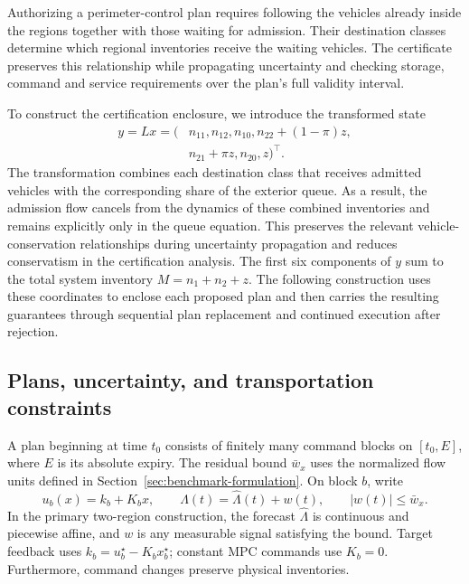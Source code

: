 \documentclass[journal,10pt]{IEEEtran}
\begin{document}
Authorizing a perimeter-control plan requires following the vehicles already
inside the regions together with those waiting for admission. Their
destination classes determine which regional inventories receive the waiting
vehicles. The certificate preserves this relationship while propagating
uncertainty and checking storage, command and service requirements over the
plan's full validity interval.

To construct the certification enclosure, we introduce the transformed state
\begin{equation}
\begin{aligned}
y=Lx=(&n_{11},n_{12},n_{10},n_{22}+(1-\pi)z,\\
      &n_{21}+\pi z,n_{20},z)^\top.
\end{aligned}
\label{eq:new-conservation-coordinates}
\end{equation}
The transformation combines each destination class that receives admitted
vehicles with the corresponding share of the exterior queue. As a result, the
admission flow cancels from the dynamics of these combined inventories and
remains explicitly only in the queue equation. This preserves the relevant
vehicle-conservation relationships during uncertainty propagation and reduces
conservatism in the certification analysis. The first six components of $y$
sum to the total system inventory $M=n_1+n_2+z$. The following construction
uses these coordinates to enclose each proposed plan and then carries the
resulting guarantees through sequential plan replacement and continued
execution after rejection.

\subsection{Plans, uncertainty, and transportation constraints}

A plan beginning at time $t_0$ consists of finitely many command blocks on
$[t_0,E]$, where $E$ is its absolute expiry. The residual bound $\bar w_x$ uses
the normalized flow units defined in Section~\ref{sec:benchmark-formulation}.
On block $b$, write
\begin{equation}
 u_b(x)=k_b+K_bx,
 \qquad \Lambda(t)=\widehat\Lambda(t)+w(t),
 \qquad |w(t)|\le\bar w_x.
 \label{eq:new-plan-data}
\end{equation}
In the primary two-region construction, the forecast $\widehat\Lambda$ is
continuous and piecewise affine, and $w$ is any measurable signal satisfying
the bound. Target feedback uses
$k_b=u_b^\star-K_bx_b^\star$; constant MPC commands use $K_b=0$.
Furthermore, command changes preserve physical inventories.
\end{document}
